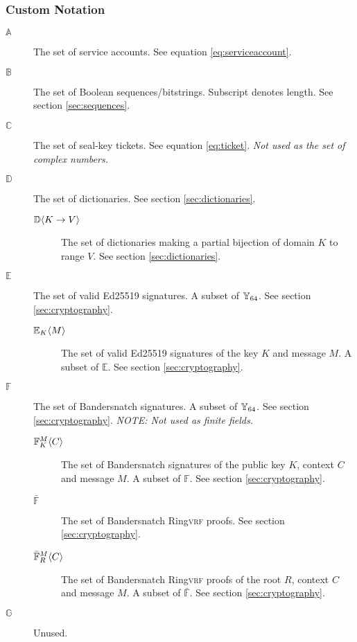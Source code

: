 \subsubsection{Custom Notation}
\begin{description}
  \item[$\mathbb{A}$] The set of service accounts. See equation \ref{eq:serviceaccount}.
  \item[$\mathbb{B}$] The set of Boolean sequences/bitstrings. Subscript denotes length. See section \ref{sec:sequences}.
  \item[$\mathbb{C}$] The set of seal-key tickets. See equation \ref{eq:ticket}. \emph{Not used as the set of complex numbers.}
  \item[$\mathbb{D}$] The set of dictionaries. See section \ref{sec:dictionaries}.
  \begin{description}
    \item[$\dict{K}{V}$] The set of dictionaries making a partial bijection of domain $K$ to range $V$. See section \ref{sec:dictionaries}.
  \end{description}
  \item[$\mathbb{E}$] The set of valid Ed25519 signatures. A subset of $\Y_{64}$. See section \ref{sec:cryptography}.
  \begin{description}
    \item[$\sig{K}{M}$] The set of valid Ed25519 signatures of the key $K$ and message $M$. A subset of $\mathbb{E}$. See section \ref{sec:cryptography}.
  \end{description}
  \item[$\mathbb{F}$] The set of Bandersnatch signatures. A subset of $\Y_{64}$. See section \ref{sec:cryptography}. \emph{NOTE: Not used as finite fields.}
  \begin{description}
    \item[$\bandersig{K}{C}{M}$] The set of Bandersnatch signatures of the public key $K$, context $C$ and message $M$. A subset of $\mathbb{F}$. See section \ref{sec:cryptography}.
    \item[$\bar{\mathbb{F}}$] The set of Bandersnatch Ring\textsc{vrf} proofs. See section \ref{sec:cryptography}.
    \item[$\bandersnatch{R}{C}{M}$] The set of Bandersnatch Ring\textsc{vrf} proofs of the root $R$, context $C$ and message $M$. A subset of $\bar{\mathbb{F}}$. See section \ref{sec:cryptography}.
  \end{description}
  \item[$\mathbb{G}$] Unused.

\end{description}
